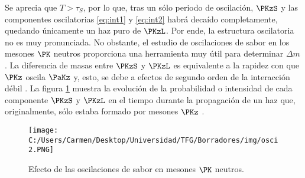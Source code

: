 Se aprecia que $T>\tau_{S}$, por lo que, tras un sólo periodo de oscilación, $\PKzS$ y las componentes oscilatorias \ref{eq:int1} y \ref{eq:int2} habrá decaído completamente, quedando únicamente un haz puro de $\PKzL$. Por ende, la estructura oscilatoria no es muy pronunciada.  No obstante, el estudio de oscilaciones de sabor en los mesones $\PK$ neutros proporciona una herramienta muy útil para determinar $\Delta m$ \cite{Thomson}. La diferencia de masas entre $\PKzS$ y $\PKzL$ es equivalente a la rapidez con que $\PKz$ oscila $\PaKz$ y, esto, se debe a efectos de segundo orden de la interacción débil \cite{Perkins}. La figura \ref{fig:oscillation2} muestra la evolución de la probabilidad o intensidad de cada componente $\PKzS$ y $\PKzL$ en el tiempo durante la propagación de un haz que, originalmente, sólo estaba formado por mesones $\PKz$ \cite{Thomson}. 

\begin{figure}[!ht]
	\centering
	\texttt{[image: C:/Users/Carmen/Desktop/Universidad/TFG/Borradores/img/osci2.PNG]}
	\caption[Efecto de las oscilaciones de sabor en mesones $\PK$ neutros.]
	{Efecto de las oscilaciones de sabor en mesones $\PK$ neutros. \cite{Thomson}}
	\label{fig:oscillation2}
\end{figure}